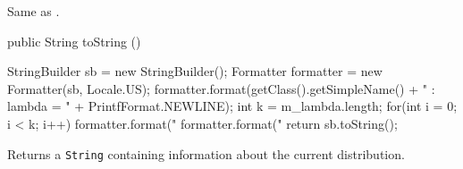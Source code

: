 \begin{tabb}
   Same as .
\end{tabb}
\begin{hide}\begin{code}

   public String toString ()\begin{hide} {
      StringBuilder sb = new StringBuilder();
      Formatter formatter = new Formatter(sb, Locale.US);
      formatter.format(getClass().getSimpleName() + " : lambda = {" +
           PrintfFormat.NEWLINE);
      int k = m_lambda.length;
      for(int i = 0; i < k; i++) {
         formatter.format("   %
      }
      formatter.format("}%
      return sb.toString();
   }\end{hide}
\end{code}
\begin{tabb}
   Returns a \texttt{String} containing information about the current
  distribution.
\end{tabb}
\end{hide}

\begin{code}\begin{hide}
}\end{hide}
\end{code}
